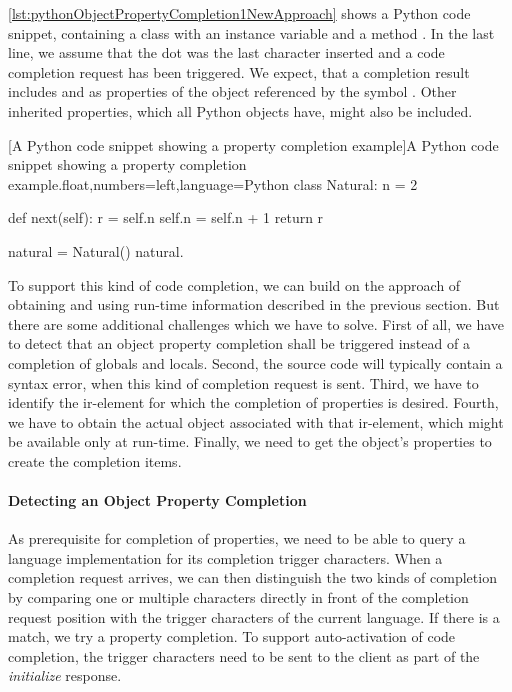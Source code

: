 \documentclass[sigplan,10pt,review,anonymous]{acmart}
\begin{document}
    \autoref{lst:pythonObjectPropertyCompletion1NewApproach} shows a Python code snippet, containing a class  with an instance variable  and a method . In the last line, we assume that the dot was the last character inserted and a code completion request has been triggered. We expect, that a completion result includes  and  as properties of the object referenced by the symbol . Other inherited properties, which all Python objects have, might also be included.

    \begin{code}{[A Python code snippet showing a property completion example]A Python code snippet showing a property completion example.}{float,numbers=left,language=Python}
class Natural:
    n = 2

    def next(self):
        r = self.n
        self.n = self.n + 1
        return r
    
natural = Natural()
natural.
    \end{code}

    To support this kind of code completion, we can build on the approach of obtaining and using run-time information described in the previous section. But there are some additional challenges which we have to solve. First of all, we have to detect that an object property completion shall be triggered instead of a completion of globals and locals. Second, the source code will typically contain a syntax error, when this kind of completion request is sent. Third, we have to identify the \ac{ir}-element for which the completion of properties is desired. Fourth, we have to obtain the actual object associated with that \ac{ir}-element, which might be available only at run-time. Finally, we need to get the object's properties to create the completion items.

    \paragraph{Detecting an Object Property Completion}
    As prerequisite for completion of properties, we need to be able to query a language implementation for its completion trigger characters. When a completion request arrives, we can then distinguish the two kinds of completion by comparing one or multiple characters directly in front of the completion request position with the trigger characters of the current language. If there is a match, we try a property completion. To support auto-activation of code completion, the trigger characters need to be sent to the client as part of the \emph{initialize} response.
\end{document}
